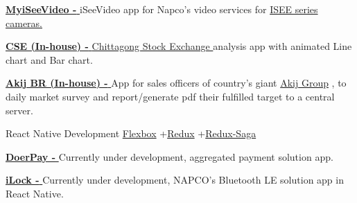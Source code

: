 \begin{projectentries}
{\begin{projectitems}
        \item {{\href{https://play.google.com/store/apps/details?id=com.napco.uidealer.myiseevideo}{\textbf{MyiSeeVideo - }}}
        iSeeVideo app for Napco's video services for 
        {\href{http://www.napcosecurity.com/products/isee-ivr250/}{ISEE series cameras.}}}  
        \item {{\href{https://drive.google.com/file/d/1AE3tdaTBA1hnKjhM2Quv4poWi6oQthwy/view?usp=sharing}{\textbf{CSE (In-house) - }}}
        {\href{https://www.cse.com.bd/}{Chittagong Stock Exchange }}
        analysis app with animated Line chart and Bar chart.}  
        \item {{\href{https://www.akij.net/}{\textbf{Akij BR (In-house) - }}}
        App for sales officers of country's giant 
        {\href{https://www.akij.net}{Akij Group}}
        , to daily market survey and report/generate pdf their fulfilled target to a central server.}  
      \end{projectitems}
    }
    

    \projectentry 
    {React Native Development} 
    {{\href{https://css-tricks.com/snippets/css/a-guide-to-flexbox/}{Flexbox}}
    +{\href{https://redux.js.org/basics/usagewithreact}{Redux}}
    +{\href{https://redux.js.org/basics/usagewithreact}{Redux-Saga}}}
    {
      \begin{projectitems} %
        \item {{\href{http://doer.com.bd}{\textbf{DoerPay - }}}
        Currently under development, aggregated payment solution app.}
        \item {{\href{http://www.alarmlock.com/news/architech-bluetooth/}{\textbf{iLock - }}}
        Currently under development, NAPCO's Bluetooth LE solution app in React Native.}  
      \end{projectitems}
    }
\end{projectentries}
